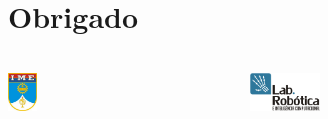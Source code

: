\documentclass{beamer}
\begin{document}
\section*{Obrigado}
\begin{frame}[b]
	\frametitle{}
	
	
	\vspace{2cm}
	\hfill
	\begin{columns}[T]
		\begin{column}[T]{3cm}	
	
			\includegraphics[height=1.0cm,keepaspectratio]{img/ime.jpg}\centering
		\end{column}
		\begin{column}[T]{3cm}
	
			\includegraphics[height=1.0cm,keepaspectratio]{img/lab-logo.png}\centering
	
		\end{column}
	\end{columns}
		
	

\end{frame}



\end{document}
